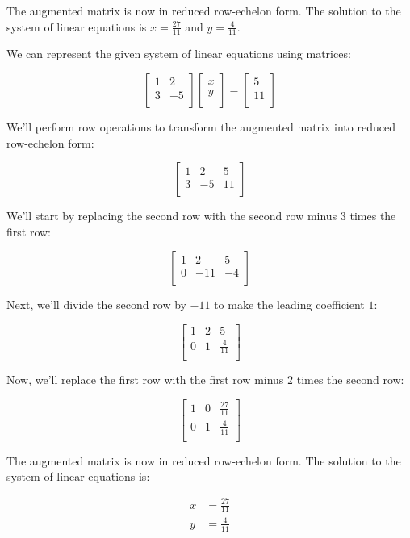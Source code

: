 \documentclass[handout]{ximera}
\begin{document}
The augmented matrix is now in reduced row-echelon form. The solution to the system of linear equations is $x = \frac{27}{11}$ and $y = \frac{4}{11}$.


We can represent the given system of linear equations using matrices:

\[
\begin{bmatrix}
1 & 2 \\
3 & -5 \\
\end{bmatrix}
\begin{bmatrix}
x \\
y \\
\end{bmatrix}
=
\begin{bmatrix}
5 \\
11 \\
\end{bmatrix}
\]

We'll perform row operations to transform the augmented matrix into reduced row-echelon form:

\[
\left[
\begin{array}{cc|c}
1 & 2 & 5 \\
3 & -5 & 11 \\
\end{array}
\right]
\]

We'll start by replacing the second row with the second row minus 3 times the first row:

\[
\left[
\begin{array}{cc|c}
1 & 2 & 5 \\
0 & -11 & -4 \\
\end{array}
\right]
\]

Next, we'll divide the second row by $-11$ to make the leading coefficient $1$:

\[
\left[
\begin{array}{cc|c}
1 & 2 & 5 \\
0 & 1 & \frac{4}{11} \\
\end{array}
\right]
\]

Now, we'll replace the first row with the first row minus 2 times the second row:

\[
\left[
\begin{array}{cc|c}
1 & 0 & \frac{27}{11} \\
0 & 1 & \frac{4}{11} \\
\end{array}
\right]
\]

The augmented matrix is now in reduced row-echelon form. The solution to the system of linear equations is:

\[
\begin{aligned}
x &= \frac{27}{11} \\
y &= \frac{4}{11} \\
\end{aligned}
\]
\end{document}
